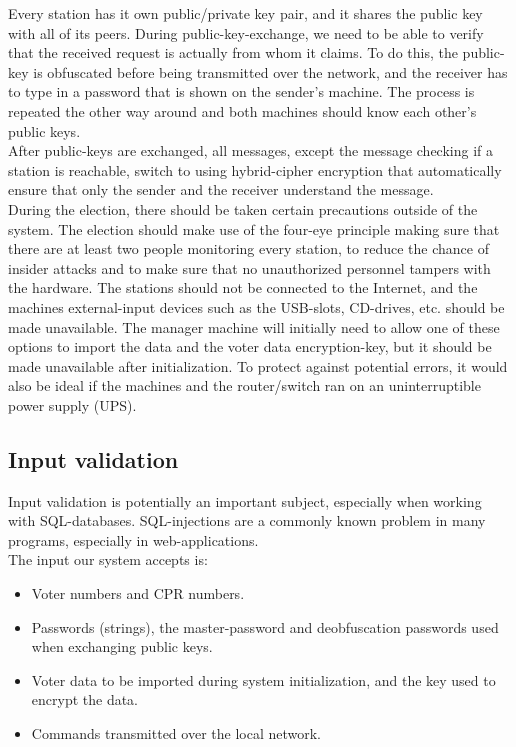 \documentclass[a4paper]{report}
\begin{document}
Every station has it own public/private key pair, and it shares the public key with all of its peers. During public-key-exchange, we need to be able to verify that the received request is actually from whom it claims. To do this, the public-key is obfuscated before being transmitted over the network, and the receiver has to type in a password that is shown on the sender's machine. The process is repeated the other way around and both machines should know each other's public keys. \\

After public-keys are exchanged, all messages, except the message checking if a station is reachable, switch to using hybrid-cipher encryption that automatically ensure that only the sender and the receiver understand the message.\\

During the election, there should be taken certain precautions outside of the system. The election should make use of the four-eye principle \cite{four} making sure that there are at least two people monitoring every station, to reduce the chance of insider attacks and to make sure that no unauthorized personnel tampers with the hardware. The stations should not be connected to the Internet, and the machines external-input devices such as the USB-slots, CD-drives, etc. should be made unavailable. The manager machine will initially need to allow one of these options to import the data and the voter data encryption-key, but it should be made unavailable after initialization. To protect against potential errors, it would also be ideal if the machines and the router/switch ran on an uninterruptible power supply (UPS).

\subsection{Input validation}
Input validation is potentially an important subject, especially when working with SQL-databases. SQL-injections are a commonly known problem in many programs, especially in web-applications. \\

The input our system accepts is:
\begin{itemize}
\item Voter numbers and CPR numbers.
\item Passwords (strings), the master-password and deobfuscation passwords used when exchanging public keys.
\item Voter data to be imported during system initialization, and the key used to encrypt the data.
\item Commands transmitted over the local network.
\end{itemize}
\end{document}
